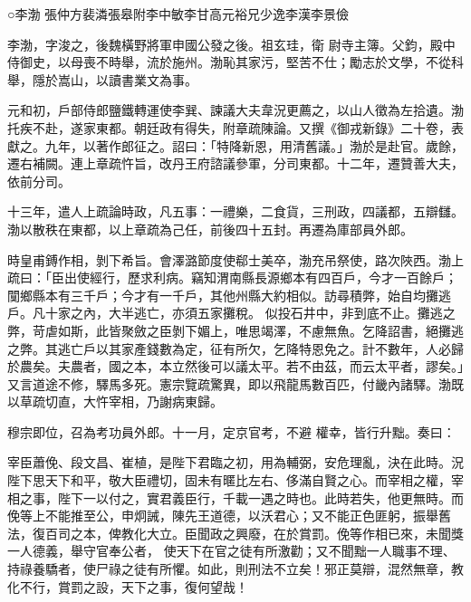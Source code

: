 
\begin{pinyinscope}

 ○李渤
 張仲方裴潾張皋附李中敏李甘高元裕兄少逸李漢李景儉



 李渤，字浚之，後魏橫野將軍申國公發之後。祖玄珪，衛
 尉寺主簿。父鈞，殿中侍御史，以母喪不時舉，流於施州。渤恥其家污，堅苦不仕；勵志於文學，不從科舉，隱於嵩山，以讀書業文為事。



 元和初，戶部侍郎鹽鐵轉運使李巽、諫議大夫韋況更薦之，以山人徵為左拾遺。渤托疾不赴，遂家東都。朝廷政有得失，附章疏陳論。又撰《御戎新錄》二十卷，表獻之。九年，以著作郎征之。詔曰：「特降新恩，用清舊議。」渤於是赴官。歲餘，遷右補闕。連上章疏忤旨，改丹王府諮議參軍，分司東都。十二年，遷贊善大夫，
 依前分司。



 十三年，遣人上疏論時政，凡五事：一禮樂，二食貨，三刑政，四議都，五辯讎。渤以散秩在東都，以上章疏為己任，前後四十五封。再遷為庫部員外郎。



 時皇甫鎛作相，剝下希旨。會澤潞節度使郗士美卒，渤充吊祭使，路次陜西。渤上疏曰：「臣出使經行，歷求利病。竊知渭南縣長源鄉本有四百戶，今才一百餘戶；闃鄉縣本有三千戶；今才有一千戶，其他州縣大約相似。訪尋積弊，始自均攤逃戶。凡十家之內，大半逃亡，亦須五家攤稅。
 似投石井中，非到底不止。攤逃之弊，苛虐如斯，此皆聚斂之臣剝下媚上，唯思竭澤，不慮無魚。乞降詔書，絕攤逃之弊。其逃亡戶以其家產錢數為定，征有所欠，乞降特恩免之。計不數年，人必歸於農矣。夫農者，國之本，本立然後可以議太平。若不由茲，而云太平者，謬矣。」又言道途不修，驛馬多死。憲宗覽疏驚異，即以飛龍馬數百匹，付畿內諸驛。渤既以草疏切直，大忤宰相，乃謝病東歸。



 穆宗即位，召為考功員外郎。十一月，定京官考，不避
 權幸，皆行升黜。奏曰：



 宰臣蕭俛、段文昌、崔植，是陛下君臨之初，用為輔弼，安危理亂，決在此時。況陛下思天下和平，敬大臣禮切，固未有暱比左右、侈滿自賢之心。而宰相之權，宰相之事，陛下一以付之，實君義臣行，千載一遇之時也。此時若失，他更無時。而俛等上不能推至公，申炯誡，陳先王道德，以沃君心；又不能正色匪躬，振舉舊法，復百司之本，俾教化大立。臣聞政之興廢，在於賞罰。俛等作相已來，未聞獎一人德義，舉守官奉公者，
 使天下在官之徒有所激勸；又不聞黜一人職事不理、持祿養驕者，使尸祿之徒有所懼。如此，則刑法不立矣！邪正莫辯，混然無章，教化不行，賞罰之設，天下之事，復何望哉！




\end{pinyinscope}
